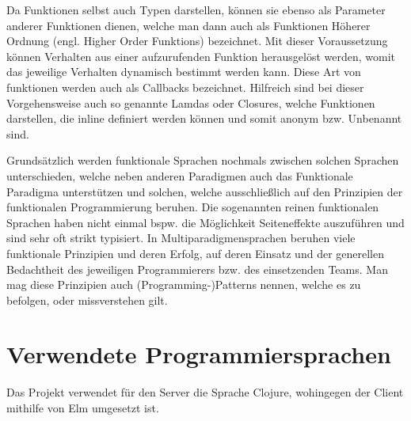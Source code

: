 \par
Da Funktionen selbst auch Typen darstellen, können sie ebenso als Parameter anderer Funktionen dienen, welche man dann auch als Funktionen Höherer Ordnung (engl. Higher Order Funktions) bezeichnet.
Mit dieser Voraussetzung können Verhalten aus einer aufzurufenden Funktion herausgelöst werden, womit das jeweilige Verhalten dynamisch bestimmt werden kann.
Diese Art von funktionen werden auch als Callbacks bezeichnet.
Hilfreich sind bei dieser Vorgehensweise auch so genannte Lamdas oder Closures, welche Funktionen darstellen, die inline definiert werden können und somit anonym \ac{bzw.} Unbenannt sind.
\par
Grundsätzlich werden funktionale Sprachen nochmals zwischen solchen Sprachen unterschieden, welche neben anderen Paradigmen auch das Funktionale Paradigma unterstützen und solchen, welche ausschließlich auf den Prinzipien der funktionalen Programmierung beruhen.
Die sogenannten reinen funktionalen Sprachen haben nicht einmal \ac{bspw.} die Möglichkeit Seiteneffekte auszuführen und sind sehr oft strikt typisiert.
In Multiparadigmensprachen beruhen viele funktionale Prinzipien und deren Erfolg, auf deren Einsatz und der generellen Bedachtheit des jeweiligen Programmierers \ac{bzw.} des einsetzenden Teams.
Man mag diese Prinzipien auch (Programming-)Patterns nennen, welche es zu befolgen, oder missverstehen gilt.

\section{Verwendete Programmiersprachen}
Das Projekt verwendet für den Server die Sprache Clojure, wohingegen der Client mithilfe von Elm umgesetzt ist.

